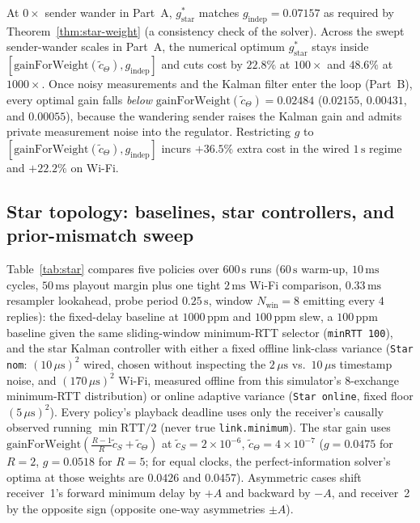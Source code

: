\documentclass[11pt,a4paper]{article}
\theoremstyle{definition}
\begin{document}
At $0\times$ sender wander in Part~A, $g_{\mathrm{star}}^*$ matches
$g_{\mathrm{indep}} = 0.07157$ as required by Theorem~\ref{thm:star-weight}
(a consistency check of the solver). Across the swept sender-wander scales in
Part~A, the numerical optimum $g_{\mathrm{star}}^*$ stays inside
$[\mathrm{gainForWeight}(\tilde c_\Theta), g_{\mathrm{indep}}]$
and cuts cost by $22.8\%$ at $100\times$ and $48.6\%$ at $1000\times$. Once
noisy measurements and the Kalman filter enter the loop (Part~B), every optimal
gain falls \emph{below} $\mathrm{gainForWeight}(\tilde c_\Theta) = 0.02484$
($0.02155$, $0.00431$, and $0.00055$), because the wandering sender raises the
Kalman gain and admits private measurement noise into the regulator. Restricting
$g$ to $[\mathrm{gainForWeight}(\tilde c_\Theta), g_{\mathrm{indep}}]$ incurs
$+36.5\%$ extra cost in the wired $1\,\text{s}$ regime and $+22.2\%$ on Wi-Fi.

\subsection{Star topology: baselines, star controllers, and prior-mismatch sweep}
\label{sec:sim-star}

Table~\ref{tab:star} compares five policies over $600\,\text{s}$ runs
($60\,\text{s}$ warm-up, $10\,\text{ms}$ cycles, $50\,\text{ms}$ playout margin
plus one tight $2\,\text{ms}$ Wi-Fi comparison, $0.33\,\text{ms}$ resampler
lookahead, probe period $0.25\,\text{s}$, window $N_{\mathrm{win}} = 8$
emitting every $4$ replies): the fixed-delay baseline at $1000\,\text{ppm}$ and
$100\,\text{ppm}$ slew, a $100\,\text{ppm}$ baseline given the same
sliding-window minimum-RTT selector (\texttt{minRTT 100}), and the star Kalman
controller with either a fixed offline link-class variance (\texttt{Star nom}:
$(10\,\mu\text{s})^2$ wired, chosen without inspecting the $2\,\mu\text{s}$ vs.\
$10\,\mu\text{s}$ timestamp noise, and $(170\,\mu\text{s})^2$ Wi-Fi, measured
offline from this simulator's 8-exchange minimum-RTT distribution) or online
adaptive variance (\texttt{Star online}, fixed floor $(5\,\mu\text{s})^2$). Every policy's playback deadline uses only
the receiver's causally observed running $\min\mathrm{RTT}/2$ (never true
\texttt{link.minimum}). The star gain uses
$\mathrm{gainForWeight}(\frac{R-1}{R}\tilde c_S + \tilde c_\Theta)$ at
$\tilde c_S = 2\times 10^{-6}$, $\tilde c_\Theta = 4\times 10^{-7}$
($g = 0.0475$ for $R = 2$, $g = 0.0518$ for $R = 5$; for equal clocks, the
perfect-information solver's optima at those weights are $0.0426$ and $0.0457$).
Asymmetric cases shift receiver~1's forward minimum delay by $+A$ and backward
by $-A$, and receiver~2 by the opposite sign (opposite one-way asymmetries
$\pm A$).
\end{document}
